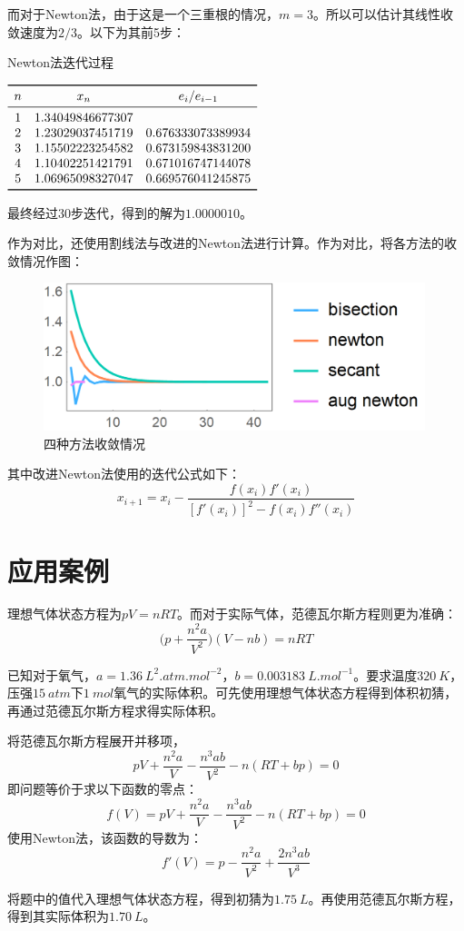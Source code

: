 \documentclass{ctexart}
\begin{document}
而对于Newton法，由于这是一个三重根的情况，$m=3$。所以可以估计其线性收敛速度为$2/3$。以下为其前5步：

\begin{table}[htpb]
\centering
\caption{Newton法迭代过程}
$\begin{array}{ccccc}
    \toprule
n & x_n & e_i/e_{i-1} \\
\midrule
 1 & 1.34049846677307 &  \\
 2 & 1.23029037451719 & 0.676333073389934 \\
 3 & 1.15502223254582 & 0.673159843831200 \\
 4 & 1.10402251421791 & 0.671016747144078 \\
 5 & 1.06965098327047 & 0.669576041245875 \\
\bottomrule
\end{array}\label{table:newton2}$
\end{table}

最终经过30步迭代，得到的解为$1.0000010$。

作为对比，还使用割线法与改进的Newton法进行计算。作为对比，将各方法的收敛情况作图：

\begin{figure}[htbp]
  \centering
  \includegraphics[width=30em]{plot7.png}
  \caption{四种方法收敛情况}
  \label{fig:plot7}
\end{figure}

其中改进Newton法使用的迭代公式如下：
\[
x_{i+1} = x_i - \frac{f(x_i)f'(x_i)}{[f'(x_i)]^2-f(x_i)f''(x_i)}
\]

\section{应用案例}
理想气体状态方程为$pV=nRT$。而对于实际气体，范德瓦尔斯方程则更为准确：
\[
\bigg( p + \frac{n^2 a}{V^2} \bigg)(V - nb) = nRT
\]

已知对于氧气，$a = \SI{1.36}{L^2.atm.mol^{-2}}$，$b=\SI{0.003183}{L.mol^{-1}}$。要求温度$\SI{320}{K}$，$压强\SI{15}{atm}$下$\SI{1}{mol}$氧气的实际体积。可先使用理想气体状态方程得到体积初猜，再通过范德瓦尔斯方程求得实际体积。

将范德瓦尔斯方程展开并移项，
\[
pV + \frac{n^2 a}{V} - \frac{n^3 ab}{V^2} - n(RT + bp) = 0
\]
即问题等价于求以下函数的零点：
\[
f(V) = pV + \frac{n^2 a}{V} - \frac{n^3 ab}{V^2} - n(RT + bp) = 0
\]
使用Newton法，该函数的导数为：
\[
f'(V) = p - \frac{n^2 a}{V^2} + \frac{2n^3 ab}{V^3}
\]

将题中的值代入理想气体状态方程，得到初猜为$\SI{1.75}{L}$。再使用范德瓦尔斯方程，得到其实际体积为$\SI{1.70}{L}$。
\end{document}
